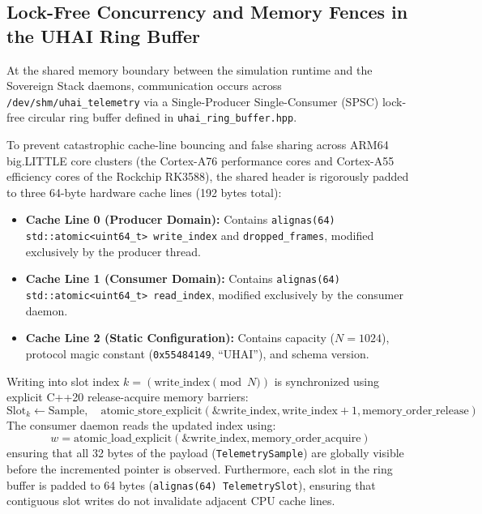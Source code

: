 \subsection{Lock-Free Concurrency and Memory Fences in the UHAI Ring Buffer}
At the shared memory boundary between the simulation runtime and the Sovereign Stack daemons, communication occurs across \texttt{/dev/shm/uhai\_telemetry} via a Single-Producer Single-Consumer (SPSC) lock-free circular ring buffer defined in \texttt{uhai\_ring\_buffer.hpp}. 

To prevent catastrophic cache-line bouncing and false sharing across ARM64 big.LITTLE core clusters (the Cortex-A76 performance cores and Cortex-A55 efficiency cores of the Rockchip RK3588), the shared header is rigorously padded to three 64-byte hardware cache lines (192 bytes total):
\begin{itemize}
    \item \textbf{Cache Line 0 (Producer Domain):} Contains \texttt{alignas(64) std::atomic\textless uint64\_t\textgreater{} write\_index} and \texttt{dropped\_frames}, modified exclusively by the producer thread.
    \item \textbf{Cache Line 1 (Consumer Domain):} Contains \texttt{alignas(64) std::atomic\textless uint64\_t\textgreater{} read\_index}, modified exclusively by the consumer daemon.
    \item \textbf{Cache Line 2 (Static Configuration):} Contains capacity ($N = 1024$), protocol magic constant (\texttt{0x55484149}, ``UHAI''), and schema version.
\end{itemize}

Writing into slot index $k = (\mathrm{write\_index} \pmod N)$ is synchronized using explicit C++20 release-acquire memory barriers:
\begin{equation}
\mathrm{Slot}_k \leftarrow \mathrm{Sample}, \quad \mathrm{atomic\_store\_explicit}(\&\mathrm{write\_index}, \mathrm{write\_index} + 1, \mathrm{memory\_order\_release})
\label{eq:memory_order_release}
\end{equation}
The consumer daemon reads the updated index using:
\begin{equation}
w = \mathrm{atomic\_load\_explicit}(\&\mathrm{write\_index}, \mathrm{memory\_order\_acquire})
\label{eq:memory_order_acquire}
\end{equation}
ensuring that all 32 bytes of the payload (\texttt{TelemetrySample}) are globally visible before the incremented pointer is observed. Furthermore, each slot in the ring buffer is padded to 64 bytes (\texttt{alignas(64) TelemetrySlot}), ensuring that contiguous slot writes do not invalidate adjacent CPU cache lines.

